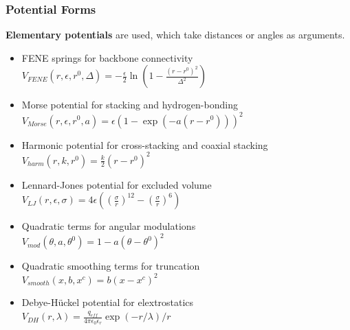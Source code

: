 \documentclass[slidestop,compress,9pt]{beamer}
\begin{document}
\begin{frame}
\frametitle{Potential Forms}
\textbf{Elementary potentials} are used, which take distances or angles as arguments.\\[10pt]
\begin{itemize}
\setlength\itemsep{7pt}
\item FENE springs for backbone connectivity\\
$V_{FENE}(r,\epsilon,r^0,\Delta)=-\frac{\epsilon}{2}\ln\left(1-\frac{(r-r^0)^2}{\Delta^2}\right)$
\item Morse potential for stacking and hydrogen-bonding\\
$V_{Morse}(r,\epsilon,r^0,a)=\epsilon(1-\exp(-a(r-r^0)))^2$
\item Harmonic potential for cross-stacking and coaxial stacking\\
$V_{harm}(r,k,r^0)=\frac{k}{2}(r-r^0)^2$
\item Lennard-Jones potential for excluded volume\\
$V_{LJ}(r,\epsilon,\sigma)=4\epsilon\left(\left(\frac{\sigma}{r}\right)^{12} - \left(\frac{\sigma}{r}\right)^6\right)$
\item Quadratic terms for angular modulations\\
$V_{mod}(\theta,a,\theta^0)=1-a(\theta-\theta^0)^2$
\item Quadratic smoothing terms for truncation\\
$V_{smooth}(x,b,x^c)=b(x-x^c)^2$
\item Debye-H\"uckel potential for elextrostatics\\
$V_{DH}(r, \lambda)=\frac{q_{eff}}{4\pi\epsilon_0\epsilon_r} \exp(-r/\lambda)/r$
\end{itemize}

\end{frame}
\end{document}
